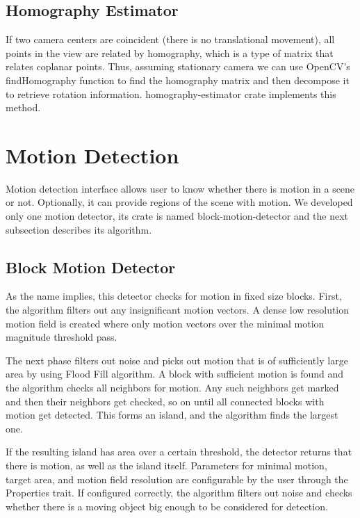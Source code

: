 \documentclass[11pt,english]{report}
\begin{document}
\subsection{Homography Estimator}

If two camera centers are coincident (there is no translational movement), all points in the view are related by homography\cite{hartley_zisserman_2004}, which is a type of matrix that relates coplanar points. Thus, assuming stationary camera we can use OpenCV's findHomography function to find the homography matrix and then decompose it to retrieve rotation information. homography-estimator crate implements this method.

\section{Motion Detection}

Motion detection interface allows user to know whether there is motion in a scene or not. Optionally, it can provide regions of the scene with motion. We developed only one motion detector, its crate is named block-motion-detector and the next subsection describes its algorithm.

\subsection{Block Motion Detector}

As the name implies, this detector checks for motion in fixed size blocks. First, the algorithm filters out any insignificant motion vectors. A dense low resolution motion field is created where only motion vectors over the minimal motion magnitude threshold pass.

The next phase filters out noise and picks out motion that is of sufficiently large area by using Flood Fill algorithm. A block with sufficient motion is found and the algorithm checks all neighbors for motion. Any such neighbors get marked and then their neighbors get checked, so on until all connected blocks with motion get detected. This forms an island, and the algorithm finds the largest one.

If the resulting island has area over a certain threshold, the detector returns that there is motion, as well as the island itself. Parameters for minimal motion, target area, and motion field resolution are configurable by the user through the Properties trait. If configured correctly, the algorithm filters out noise and checks whether there is a moving object big enough to be considered for detection.
\end{document}
